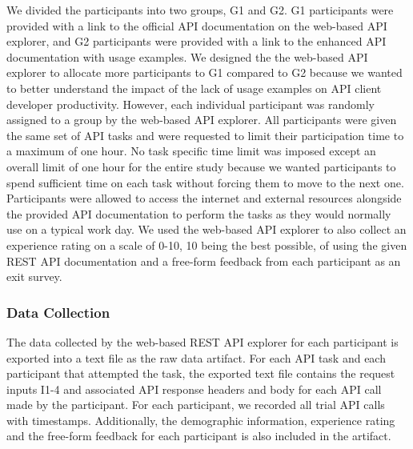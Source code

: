 \documentclass[conference]{IEEEtran}
\begin{document}
We divided the participants into two groups, G1 and G2. G1 participants were provided with a link to the official API documentation on the web-based API explorer, and G2 participants were provided with a link to the enhanced API documentation with usage examples. We designed the the web-based API explorer to allocate more participants to G1 compared to G2 because we wanted to better understand the impact of the lack of usage examples on API client developer productivity. However, each individual participant was randomly assigned to a group by the web-based API explorer. All participants were given the same set of API tasks and were requested to limit their participation time to a maximum of one hour. No task specific time limit was imposed except an overall limit of one hour for the entire study because we wanted participants to spend sufficient time on each task without forcing them to move to the next one. Participants were allowed to access the internet and external resources alongside the provided API documentation to perform the tasks as they would normally use on a typical work day. We used the web-based API explorer to also collect an experience rating on a scale of 0-10, 10 being the best possible, of using the given REST API documentation and a free-form feedback from each participant as an exit survey.

\subsubsection{Data Collection} %
The data collected by the web-based REST API explorer for each participant is exported into a text file as the raw data artifact. For each API task and each participant that attempted the task, the exported text file contains the request inputs I1-4 and associated API response headers and body for each API call made by the participant. For each participant, we recorded all trial API calls with timestamps. Additionally, the demographic information, experience rating and the free-form feedback for each participant is also included in the artifact.


\pgfplotsset{compat=1.14}
\usetikzlibrary{patterns}
\groupone
\end{document}
